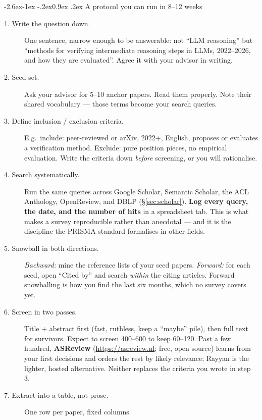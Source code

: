 \documentclass[11pt,a4paper]{article}
\makeatletter
\renewcommand\subsection{\@startsection{subsection}{2}{\z@}%
  {-2.6ex\@plus -1ex \@minus -.2ex}{0.9ex \@plus .2ex}%
  {\normalfont\large\bfseries\color{brandlight}}}
\makeatother
\begin{document}
\subsection{A protocol you can run in 8--12 weeks}

\begin{description}
  \item[1. Write the question down.] One sentence, narrow enough to be
        answerable: not ``LLM reasoning'' but ``methods for verifying
        intermediate reasoning steps in LLMs, 2022--2026, and how they are
        evaluated''. Agree it with your advisor in writing.
  \item[2. Seed set.] Ask your advisor for 5--10 anchor papers. Read them
        properly. Note their shared vocabulary --- those terms become your
        search queries.
  \item[3. Define inclusion / exclusion criteria.] E.g.\ include: peer-reviewed
        or arXiv, 2022+, English, proposes or evaluates a verification method.
        Exclude: pure position pieces, no empirical evaluation. Write the
        criteria down \emph{before} screening, or you will rationalise.
  \item[4. Search systematically.] Run the same queries across Google Scholar,
        Semantic Scholar, the ACL Anthology, OpenReview, and DBLP
        (\S\ref{sec:scholar}). \textbf{Log every query, the date, and the
        number of hits} in a spreadsheet tab. This is what makes a survey
        reproducible rather than anecdotal --- and it is the discipline the
        PRISMA standard formalises in other fields.
  \item[5. Snowball in both directions.] \emph{Backward:} mine the reference
        lists of your seed papers. \emph{Forward:} for each seed, open
        ``Cited by'' and search \emph{within} the citing articles. Forward
        snowballing is how you find the last six months, which no survey
        covers yet.
  \item[6. Screen in two passes.] Title + abstract first (fast, ruthless,
        keep a ``maybe'' pile), then full text for survivors. Expect to screen
        400--600 to keep 60--120. Past a few hundred, \textbf{ASReview}
        (\url{https://asreview.nl}; free, open source) learns from your first
        decisions and orders the rest by likely relevance; Rayyan is the
        lighter, hosted alternative. Neither replaces the criteria you wrote
        in step 3.
  \item[7. Extract into a table, not prose.] One row per paper, fixed columns

\end{description}
\end{document}
